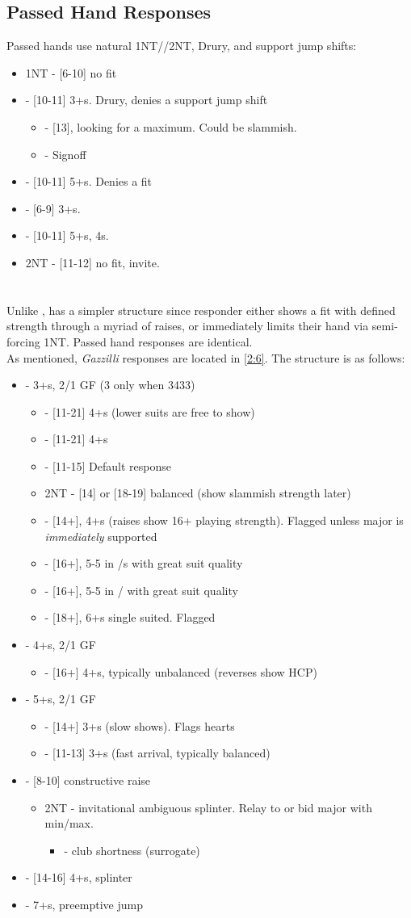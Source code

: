 \documentclass[12pt]{report}
\newcommand{\n}{\\}
\newcommand{\q}[1]{\multido{}{#1}{\qquad}}
\newcommand{\ul}[1]{\begin{itemize}#1\end{itemize}}
\newcommand{\li}[1]{\item[~] \q{#1}}
\newcommand{\bidsection}[2]{\section{\texorpdfstring{#1}{#2}}}
\begin{document}
\subsection{Passed Hand Responses}
    Passed hands use natural 1NT//2NT,  Drury, and support jump shifts:
    \ul {
        \li0 1NT - [6-10] no fit
        \li0 \cl2 - [10-11] 3+\he{}s.  Drury, denies a support jump shift
        \ul {
            \li0 \di2 - [13], looking for a maximum.  Could be slammish.
            \li0 \he2 - Signoff
        }
        \li0 \di2 - [10-11] 5+\di{}s.  Denies a fit
        \li0 \he2 - [6-9] 3+\he{}s.
        \li0 \sp2 - [10-11] 5+\sp{}s, 4\he{}s.
        \li0 2NT - [11-12] no fit, invite.
    }

\bidsection{}{1♠} \label{2:5}

    Unlike ,  has a simpler structure since responder either shows a fit with defined strength through a myriad of raises, or immediately limits their hand via semi-forcing 1NT. Passed hand responses are identical. \n

    As mentioned, \textit{Gazzilli} responses are located in \ref{2:6}.  The structure is as follows:

    \ul {
        \li0  - 3+\cl{}s, 2/1 GF (3 only when 3433)
        \ul {
            \li0 \di2 - [11-21] 4+\di{}s (lower suits are free to show)
            \li0 \he2 - [11-21] 4+\he{}s
            \li0 \sp2 - [11-15] Default response
            \li0 2NT - [14] or [18-19] balanced (show slammish strength later)
            \li0 \cl3 - [14+], 4+\cl{}s (raises show 16+ playing strength).  Flagged unless major is \textit{immediately} supported
            \li0 \di3 - [16+], 5-5 in \di{}/\sp{}s with great suit quality
            \li0 \he3 - [16+], 5-5 in \he{}/\sp{} with great suit quality
            \li0 \sp3 - [18+], 6+\sp{}s single suited.  Flagged
        }
        \li0 \di2 - 4+\di{}s, 2/1 GF
        \ul {
            \li0 \cl3 - [16+] 4+\cl{}s, typically unbalanced (reverses show HCP)
        }
        \li0 \he2 - 5+\he{}s, 2/1 GF
        \ul {
            \li0 \he3 - [14+] 3+\he{}s (slow shows).  Flags hearts
            \li0 \he4 - [11-13] 3+\he{}s (fast arrival, typically balanced)
        }
        \li0 \sp2 - [8-10] constructive raise
        \ul {
            \li0 2NT - invitational ambiguous splinter.  Relay to \cl3 or bid major with min/max.
            \ul {
                \li0 \cl3- club shortness (surrogate)
            }
        }
        \li0 \he3 - [14-16] 4+\sp{}s, splinter
        \li0 \he4 - 7+\he{}s, preemptive jump
    }
\end{document}

